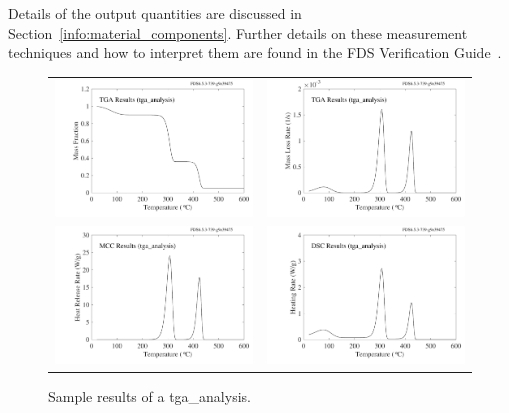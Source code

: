 \documentclass[11pt]{book}
\begin{document}
Details of the output quantities are discussed in Section~\ref{info:material_components}. Further details on these measurement techniques and how to interpret them are found in the FDS Verification Guide~\cite{FDS_Verification_Guide}.

\begin{figure}[ht]
\begin{tabular*}{\textwidth}{lr}
\includegraphics[width=3.2in]{SCRIPT_FIGURES/tga_analysis_mass} &
\includegraphics[width=3.2in]{SCRIPT_FIGURES/tga_analysis_mlr} \\
\includegraphics[width=3.2in]{SCRIPT_FIGURES/tga_analysis_mcc} &
\includegraphics[width=3.2in]{SCRIPT_FIGURES/tga_analysis_dsc}
\end{tabular*}
\caption[Sample results of a {\ct tga\_analysis}]{Sample results of a {\ct tga\_analysis}.}
\label{tga_results}
\end{figure}
\end{document}
